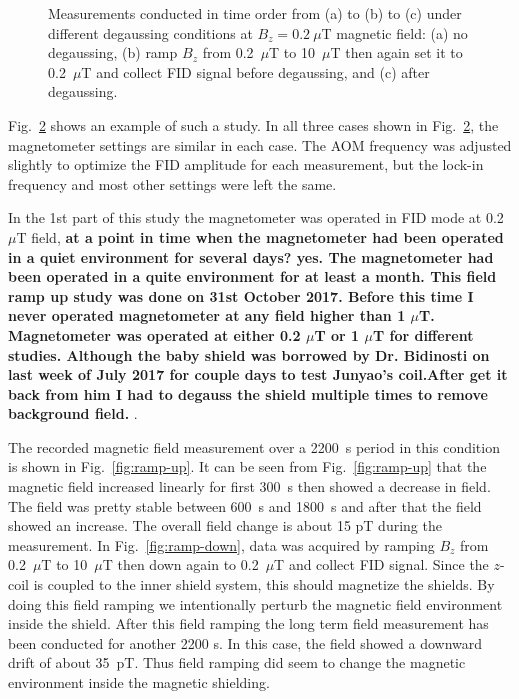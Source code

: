 \begin{figure}
\begin{subfigure}[b]{0.48\textwidth}
    \caption{}
    \label{fig:degauss}
  \end{subfigure}
  \caption{Measurements conducted in time order from (a) to (b) to (c)
    under different degaussing conditions at $B_z=0.2~\mu$T magnetic
    field: (a) no degaussing, (b) ramp $B_z$ from 0.2~$\mu$T to
    10~$\mu$T then again set it to 0.2~$\mu$T and collect FID signal
    before degaussing, and (c) after degaussing.}
  \label{fig:ramp-updown}
\end{figure}

Fig.~\ref{fig:ramp-updown} shows an example of such a study.  In all
three cases shown in Fig.~\ref{fig:ramp-updown}, the magnetometer
settings are similar in each case.  The AOM frequency was adjusted
slightly to optimize the FID amplitude for each measurement, but the
lock-in frequency and most other settings were left the same.
  
In the 1st part of this study the magnetometer was operated in FID
mode at 0.2~$\mu$T field, {\bf at a point in time when the
  magnetometer had been operated in a quiet environment for several
  days? yes. The magnetometer had been operated in a quite environment for at least a month. This field ramp up study was done on 31st October 2017. Before this time I never operated magnetometer at any  field higher than 1 $\mu$T. Magnetometer was operated at either 0.2 $\mu$T or 1 $\mu$T  for different studies. Although the baby shield was borrowed by Dr. Bidinosti on last week of July 2017 for couple days to test Junyao's coil.After get it back from him I had to degauss the shield multiple times to remove background field. }. 
  
  
  The recorded magnetic field measurement over a 2200~s period
in this condition is shown in Fig.~\ref{fig:ramp-up}.  It can be seen
from Fig.~\ref{fig:ramp-up} that the magnetic field increased linearly
for first 300~s then showed a decrease in field. The field was pretty
stable between 600~s and 1800~s and after that the field showed an
increase. The overall field change is about 15 pT during the
measurement.  In Fig.~\ref{fig:ramp-down}, data was acquired by
ramping $B_z$ from 0.2~$\mu$T to 10~$\mu$T then down again to
0.2~$\mu$T and collect FID signal.  Since the $z$-coil is coupled to
the inner shield system, this should magnetize the shields.  By doing
this field ramping we intentionally perturb the magnetic field
environment inside the shield.  After this field ramping the long term
field measurement has been conducted for another 2200 s. In this case,
the field showed a downward drift of about 35~pT.  Thus field ramping
did seem to change the magnetic environment inside the magnetic
shielding.

